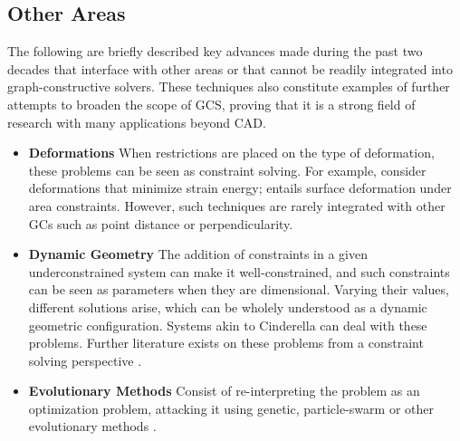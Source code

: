 \subsection{Other Areas}
\label{sec:intro.constraints.other}

The following are briefly described key advances made during the past two
decades that interface with other areas or that cannot be readily integrated
into graph-constructive solvers.  These techniques also constitute examples of
further attempts to broaden the scope of \ac{GCS}, proving that it is a strong
field of research with many applications beyond \ac{CAD}.

\begin{itemize}
  \item[] \textbf{Deformations} When restrictions are placed on the type of
          deformation, these problems can be seen as constraint solving.  For
          example, \cite{Ahn:2011:LEQBCA,Bao:2010:BIVCMSE,Moll:2006:PPDLO}
          consider deformations that minimize strain energy;
          \cite{Xu:2009:SDUAC} entails surface deformation under area
          constraints.  However, such techniques are rarely integrated with other
          \acp{GC} such as point distance or perpendicularity.
  \item[] \textbf{Dynamic Geometry} The addition of constraints in a given
          underconstrained system can make it well-constrained, and such
          constraints can be seen as parameters when they are dimensional.
          Varying their values, different solutions arise, which can be wholely
          understood as a dynamic geometric configuration.  Systems akin to
          Cinderella \cite{Richter:2012:Cinderella.2} can deal with these
          problems.  Further literature exists on these problems from a
          constraint solving perspective \cite{Freixas:2010:CDGS}.
  \item[] \textbf{Evolutionary Methods} Consist of re-interpreting the problem
          as an optimization problem, attacking it using genetic, particle-swarm
          or other evolutionary methods
          \cite{Chunhong:2006:PDBOEA,Li:2012:HASPSOASGCP}.
\end{itemize}
